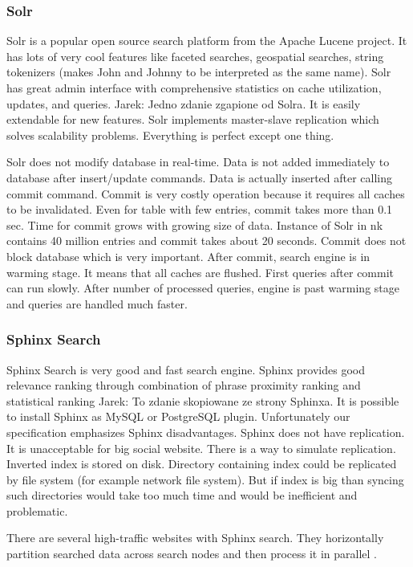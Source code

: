 \documentclass[10pt,a4paper]{article}
\newcommand{\jarek}[1]{\noindent\colorbox{myYellow}{Jarek: #1}}
\begin{document}
\subsubsection{Solr}

Solr is a popular open source search platform from the Apache Lucene project. It has lots of very cool features like faceted searches, geospatial searches, string tokenizers (makes John and Johnny to be interpreted as the same name). Solr has great admin interface with comprehensive statistics on cache utilization, updates, and queries. \jarek{Jedno zdanie zgapione od Solra}. It is easily extendable for new features. Solr implements master-slave replication which solves scalability problems. Everything is perfect except one thing. 

Solr does not modify database in real-time. Data is not added immediately to database after insert/update commands. Data is actually inserted after calling commit command. Commit is very costly operation because it requires all caches to be invalidated. Even for table with few entries, commit takes more than 0.1 sec. Time for commit grows with growing size of data. Instance of Solr in nk contains 40 million entries and commit takes about 20 seconds. Commit does not block database which is very important. After commit, search engine is in warming stage. It means that all caches are flushed. First queries after commit can run slowly. After number of processed queries, engine is past warming stage and queries are handled much faster.

\subsubsection{Sphinx Search}

Sphinx Search is very good and fast search engine. Sphinx provides good relevance ranking through combination of phrase proximity ranking and statistical ranking \jarek{To zdanie skopiowane ze strony Sphinxa}. It is possible to install Sphinx as MySQL or PostgreSQL plugin. Unfortunately our specification emphasizes Sphinx disadvantages.
Sphinx does not have replication. It is unacceptable for big social website. There is a way to simulate replication. Inverted index is stored on disk. Directory containing index could be replicated by file system (for example network file system). But if index is big than syncing such directories would take too much time and would be inefficient and problematic.

There are several high-traffic websites with Sphinx search. They horizontally partition searched data across search nodes and then process it in parallel \cite{SPHINXPARAL}.
\end{document}
